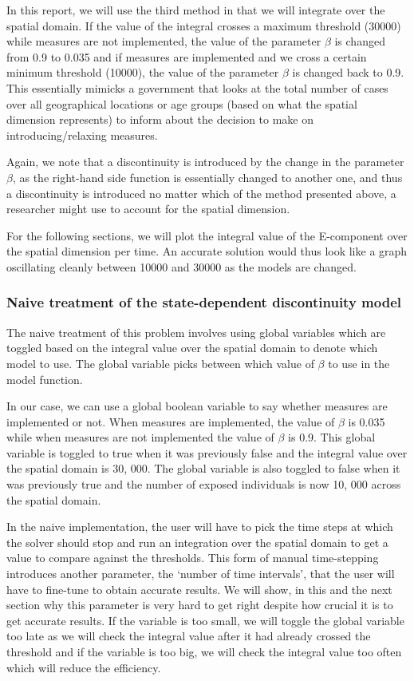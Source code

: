 \documentclass{article}
\begin{document}
In this report, we will use the third method in that we will integrate over the spatial domain. If the value of the integral crosses a maximum threshold (30000) while measures are not implemented, the value of the parameter $\beta$ is changed from 0.9 to 0.035 and if measures are implemented and we cross a certain minimum threshold (10000), the value of the parameter $\beta$ is changed back to 0.9. This essentially mimicks a government that looks at the total number of cases over all geographical locations or age groups (based on what the spatial dimension represents) to inform about the decision to make on introducing/relaxing measures.

Again, we note that a discontinuity is introduced by the change in the parameter $\beta$, as the right-hand side function is essentially changed to another one, and thus a discontinuity is introduced no matter which of the method presented above, a researcher might use to account for the spatial dimension.

For the following sections, we will plot the integral value of the E-component over the spatial dimension per time. An accurate solution would thus look like a graph oscillating cleanly between 10000 and 30000 as the models are changed.

\subsubsection{Naive treatment of the state-dependent discontinuity model}
\label{subsubsection:pde_state_naive}
The naive treatment of this problem involves using global variables which are toggled based on the integral value over the spatial domain to denote which model to use. The global variable picks between which value of $\beta$ to use in the model function.

In our case, we can use a global boolean variable to say whether measures are implemented or not. When measures are implemented, the value of $\beta$ is 0.035 while when measures are not implemented the value of $\beta$ is 0.9. This global variable is toggled to true when it was previously false and the integral value over the spatial domain is 30, 000. The global variable is also toggled to false when it was previously true and the number of exposed individuals is now 10, 000 across the spatial domain. 

In the naive implementation, the user will have to pick the time steps at which the solver should stop and run an integration over the spatial domain to get a value to compare against the thresholds. This form of manual time-stepping introduces another parameter, the `number of time intervals', that the user will have to fine-tune to obtain accurate results. We will show, in this and the next section why this parameter is very hard to get right despite how crucial it is to get accurate results. If the variable is too small, we will toggle the global variable too late as we will check the integral value after it had already crossed the threshold and if the variable is too big, we will check the integral value too often which will reduce the efficiency. 
\end{document}

